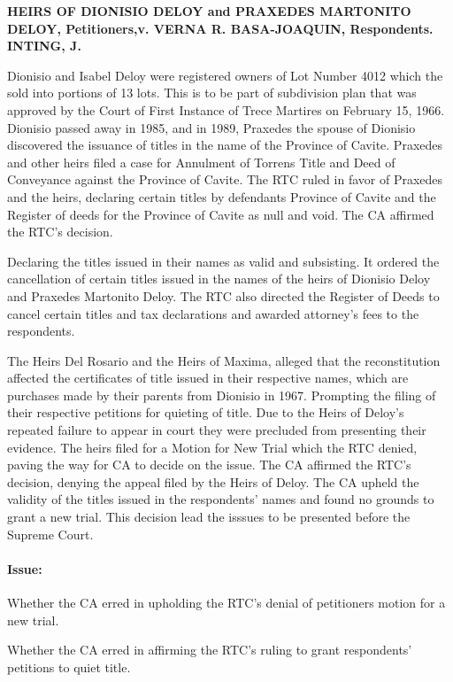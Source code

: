 \documentclass[
12pt,
oneside,
onehalfspacing,
headsepline
]{DigestCollection}
\begin{document}
\noindent\textbf{HEIRS OF DIONISIO DELOY and PRAXEDES MARTONITO DELOY, Petitioners,v. VERNA R. BASA-JOAQUIN, Respondents. INTING, J.}\vspace{0.4cm} 

Dionisio and Isabel Deloy were registered owners of Lot Number 4012 which the sold into portions of 13 lots. This is to be part of subdivision plan that was approved by the Court of First Instance of Trece Martires on February 15, 1966. Dionisio passed away in 1985, and in 1989, Praxedes the spouse of Dionisio discovered the issuance of titles in the name of the Province of Cavite. Praxedes and other heirs filed a case for Annulment of Torrens Title and Deed of Conveyance against the Province of Cavite. The RTC ruled in favor of Praxedes and the heirs, declaring certain titles by defendants Province of Cavite and the Register of deeds for the Province of Cavite as null and void. The CA affirmed the RTC's decision.

Declaring the titles issued in their names as valid and subsisting. It ordered the cancellation of certain titles issued in the names of the heirs of Dionisio Deloy and Praxedes Martonito Deloy. The RTC also directed the Register of Deeds to cancel certain titles and tax declarations and awarded attorney's fees to the respondents. 

The Heirs Del Rosario and the Heirs of Maxima, alleged that the reconstitution affected the certificates of title issued in their respective names, which are purchases made by their parents from Dionisio in 1967. Prompting the filing of their respective petitions for quieting of title. Due to the Heirs of Deloy's repeated failure to appear in court they were precluded from presenting their evidence. The heirs filed for a Motion for New Trial which the RTC denied, paving the way for CA to decide on the issue. The CA affirmed the RTC's decision, denying the appeal filed by the Heirs of Deloy. The CA upheld the validity of the titles issued in the respondents' names and found no grounds to grant a new trial. This decision lead the isssues to be presented before the Supreme Court.

\paragraph{Issue:}
\label{e066a5e0-124d-11ef-aa24-9916ea601717}


Whether the CA erred in upholding the RTC's denial of petitioners motion for a new trial.

Whether the CA erred in affirming the RTC's ruling to grant respondents' petitions to quiet title.
\end{document}
